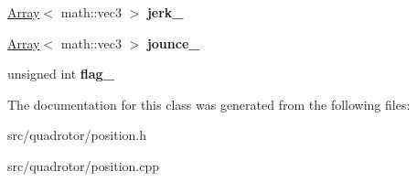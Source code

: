 \begin{DoxyCompactItemize}
\item 
\hypertarget{classPosition_af739ad03cbe3d29eee7aa0631d1e3c1f}{
\hyperlink{classArray}{Array}$<$ math::vec3 $>$ {\bfseries jerk\_\-}}
\label{classPosition_af739ad03cbe3d29eee7aa0631d1e3c1f}

\item 
\hypertarget{classPosition_a5f22c101e8a63183849a30ede8308b04}{
\hyperlink{classArray}{Array}$<$ math::vec3 $>$ {\bfseries jounce\_\-}}
\label{classPosition_a5f22c101e8a63183849a30ede8308b04}

\item 
\hypertarget{classPosition_a940b73c924b7a90b293f733ea168da7e}{
unsigned int {\bfseries flag\_\-}}
\label{classPosition_a940b73c924b7a90b293f733ea168da7e}

\end{DoxyCompactItemize}


The documentation for this class was generated from the following files:\begin{DoxyCompactItemize}
\item 
src/quadrotor/position.h\item 
src/quadrotor/position.cpp\end{DoxyCompactItemize}
